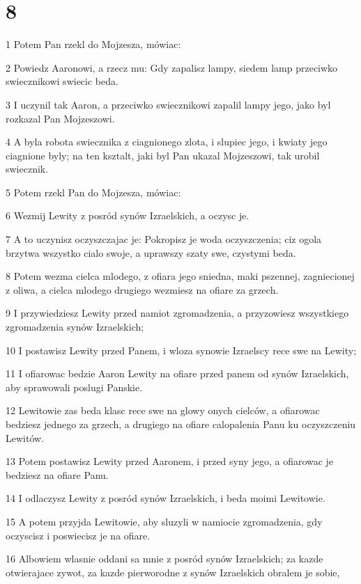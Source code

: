 \chapter{8}

\par 1 Potem Pan rzekl do Mojzesza, mówiac:
\par 2 Powiedz Aaronowi, a rzecz mu: Gdy zapalisz lampy, siedem lamp przeciwko swiecznikowi swiecic beda.
\par 3 I uczynil tak Aaron, a przeciwko swiecznikowi zapalil lampy jego, jako byl rozkazal Pan Mojzeszowi.
\par 4 A byla robota swiecznika z ciagnionego zlota, i slupiec jego, i kwiaty jego ciagnione byly; na ten ksztalt, jaki byl Pan ukazal Mojzeszowi, tak urobil swiecznik.
\par 5 Potem rzekl Pan do Mojzesza, mówiac:
\par 6 Wezmij Lewity z posród synów Izraelskich, a oczysc je.
\par 7 A to uczynisz oczyszczajac je: Pokropisz je woda oczyszczenia; ciz ogola brzytwa wszystko cialo swoje, a uprawszy szaty swe, czystymi beda.
\par 8 Potem wezma cielca mlodego, z ofiara jego sniedna, maki pszennej, zagniecionej z oliwa, a cielca mlodego drugiego wezmiesz na ofiare za grzech.
\par 9 I przywiedziesz Lewity przed namiot zgromadzenia, a przyzowiesz wszystkiego zgromadzenia synów Izraelskich;
\par 10 I postawisz Lewity przed Panem, i wloza synowie Izraelscy rece swe na Lewity;
\par 11 I ofiarowac bedzie Aaron Lewity na ofiare przed panem od synów Izraelskich, aby sprawowali poslugi Panskie.
\par 12 Lewitowie zas beda klasc rece swe na glowy onych cielców, a ofiarowac bedziesz jednego za grzech, a drugiego na ofiare calopalenia Panu ku oczyszczeniu Lewitów.
\par 13 Potem postawisz Lewity przed Aaronem, i przed syny jego, a ofiarowac je bedziesz na ofiare Panu.
\par 14 I odlaczysz Lewity z posród synów Izraelskich, i beda moimi Lewitowie.
\par 15 A potem przyjda Lewitowie, aby sluzyli w namiocie zgromadzenia, gdy oczyscisz i poswiecisz je na ofiare.
\par 16 Albowiem wlasnie oddani sa mnie z posród synów Izraelskich; za kazde otwierajace zywot, za kazde pierworodne z synów Izraelskich obralem je sobie,
